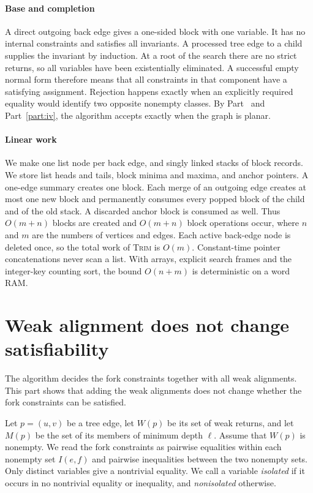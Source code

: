 \documentclass[11pt]{article}
\newcommand{\pr}[1]{\textsc{#1}}
\begin{document}
\subsection*{Base and completion}

A direct outgoing back edge gives a one-sided block with one variable. It has
no internal constraints and satisfies all invariants. A processed tree edge to a
child supplies the invariant by induction. At a root of the search there are
no strict returns, so all variables have been existentially eliminated. A
successful empty normal form therefore means that all constraints in that
component have a satisfying assignment. Rejection happens exactly when an
explicitly required equality would identify two opposite nonempty classes. By
Part~\ref{part:iii} and Part~\ref{part:iv}, the algorithm accepts exactly when
the graph is planar.

\subsection*{Linear work}

We make one list node per back edge, and singly linked stacks of block records.
We store list heads and tails, block minima and maxima, and anchor pointers. A
one-edge summary creates one block. Each merge of an outgoing edge creates at
most one new block and permanently consumes every popped block of the child and
of the old stack. A discarded anchor block is consumed as well. Thus $O(m+n)$
blocks are created and $O(m+n)$ block operations occur, where $n$ and $m$ are
the numbers of vertices and edges. Each active back-edge node is deleted once,
so the total work of \pr{Trim} is $O(m)$. Constant-time pointer
concatenations never scan a list. With arrays, explicit search frames and the
integer-key counting sort, the bound $O(n+m)$ is deterministic on a word RAM.

\part{Weak alignment does not change satisfiability}\label{part:iii}

The algorithm decides the fork constraints together with all weak alignments.
This part shows that adding the weak alignments does not change whether the
fork constraints can be satisfied.

Let $p=(u,v)$ be a tree edge, let $W(p)$ be its set of weak returns, and let
$M(p)$ be the set of its members of minimum depth $\ell$. Assume that $W(p)$ is
nonempty. We read the fork constraints as pairwise equalities within each
nonempty set $I(e,f)$ and pairwise inequalities between the two nonempty sets.
Only distinct variables give a nontrivial equality. We call a variable
\emph{isolated} if it occurs in no nontrivial equality or inequality, and
\emph{nonisolated} otherwise.
\end{document}
